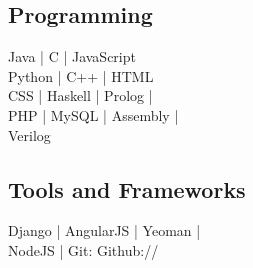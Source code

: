 \documentclass[a4paper]{deedy-resume-openfont}
\begin{document}
\begin{minipage}[t]{0.33\textwidth}
\subsection{Programming}
\hspace{0.6cm}Java | C | JavaScript \\
\hspace{0.6cm}Python | C++ | HTML \\
\hspace{0.6cm}CSS | Haskell | Prolog | \\
\hspace{0.6cm}PHP | MySQL | Assembly | \\ 
\hspace{0.6cm}Verilog \\
\vskip 0.5cm
\subsection{Tools and Frameworks}
\hspace{0.6cm}Django | AngularJS | Yeoman | \\ 
\hspace{0.6cm}NodeJS | Git: Github://  \href{https://github.com/vasinwr}{}
\sectionsep

%
%

\end{minipage} 
\hfill
\end{document}

